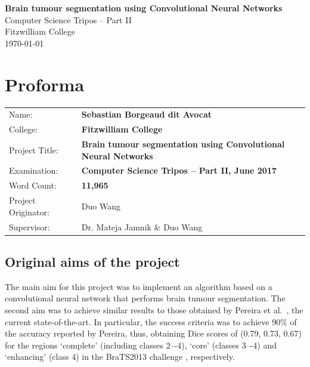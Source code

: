 \documentclass[12pt,a4paper,twoside,openright]{report}
\begin{document}





\pagestyle{empty}


\vspace*{60mm}
\begin{center}
\Huge
\textbf{Brain tumour segmentation using Convolutional Neural Networks} \\[5mm]
Computer Science Tripos -- Part II \\[5mm]
Fitzwilliam College\\[5mm]
\today  %
\end{center}


\pagestyle{plain}

\chapter*{Proforma}

{\large
\begin{tabular}{lp{12cm}}
Name:               & \bf Sebastian Borgeaud dit Avocat                       \\
College:            & \bf Fitzwilliam College                     \\
Project Title:      & \bf Brain tumour segmentation using Convolutional Neural Networks\\
Examination:        & \bf Computer Science Tripos -- Part II, June 2017  \\
Word Count:         & \bf 11,965\footnotemark[1]
  \\
Project Originator: & Duo Wang                    \\
Supervisor:         & Dr. Mateja Jamnik \& Duo Wang                    \\ 
\end{tabular}
}
\section*{Original aims of the project}
The main aim for this project was to implement an algorithm based on a convolutional neural network that performs brain tumour segmentation. The second aim was to achieve similar results to those obtained by Pereira et al.\ \cite{pereira}, the current \mbox{state-of-the-art}. In particular, the success criteria was to achieve 90\% of the accuracy reported by Pereira, thus, obtaining Dice scores of (0.79, 0.73, 0.67) for the regions `complete' (including classes 2–-4), ‘core’ (classes 3–-4) and ‘enhancing’ (class 4) in the BraTS2013 challenge \cite{brats-proceedings}, respectively.
\end{document}
